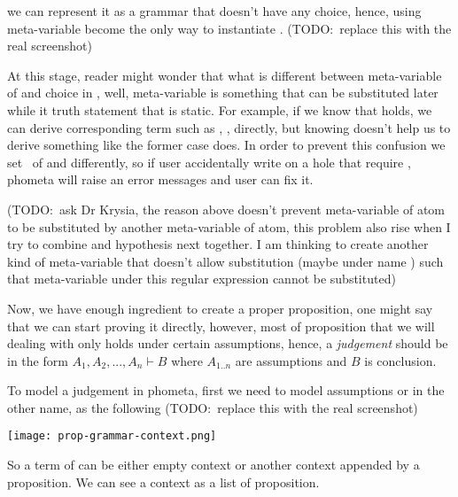 \documentclass[master.tex]{subfiles}
\begin{document}
we can represent
it as a grammar that doesn't have any choice, hence, using meta-variable become
the only way to instantiate . (TODO:\ replace this with the real
screenshot)

At this stage, reader might wonder that what is different between meta-variable
of  and  choice in , well, meta-variable is
something that can be substituted later while  it truth statement that
is static. For example,
if we know that  holds, we can derive
corresponding term such as \bat{\propTop\propOr\bat{\propNot\propTop}},
,
directly, but knowing
 doesn't
help us to derive something like the former case does. In order to prevent this
confusion we set \kVarRegex\ of  and  differently, so if
user accidentally write  on a hole that require , phometa
will raise an error messages and user can fix it.

(TODO:\ ask Dr Krysia, the reason above doesn't prevent meta-variable of atom to
be substituted by another meta-variable of atom, this problem also rise when I
try to combine  and hypothesis next together. I am
thinking to create another kind of meta-variable that doesn't allow substitution
(maybe under name ) such that meta-variable under this regular
expression cannot be substituted)

Now, we have enough ingredient to create a proper proposition, one might say
that we can start proving it directly, however, most of proposition that we will
dealing with only holds under certain assumptions, hence, a \emph{judgement}
should be in the form $A_1, A_2, ..., A_n \vdash B$ where $A_{1..n}$ are
assumptions and $B$ is conclusion.

To model a judgement in phometa, first we need to model assumptions or in the
other name,  as the following (TODO:\ replace this with the real
screenshot)

\centerline{\texttt{[image: prop-grammar-context.png]}}

\newcommand{\propEmptyContext}{\bat{\pifmt{$\epsilon$}}}

So a term of  can be either empty context or another context
appended by a proposition. We can see a context as a list of proposition.
\end{document}
